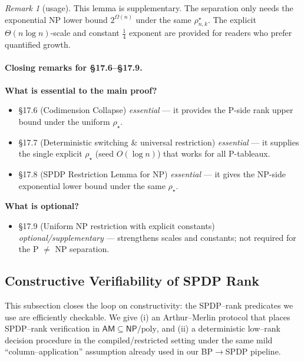 \documentclass[12pt]{article}
\theoremstyle{definition}
\theoremstyle{definition}
\theoremstyle{remark}
\newtheorem{remark}{Remark}
\theoremstyle{remark}
\begin{document}
\begin{remark}[usage]
This lemma is supplementary. The separation only needs the exponential NP lower bound $2^{\Omega(n)}$ under the same $\rho^\star_{n,k}$. The explicit $\Theta(n\log n)$-scale and constant $\frac{1}{4}$ exponent are provided for readers who prefer quantified growth.
\end{remark}

\paragraph{Closing remarks for \S17.6--\S17.9.}

\textbf{What is essential to the main proof?}

\begin{itemize}
\item \S17.6 (Codimension Collapse) \emph{essential} --- it provides the P-side rank upper bound under the uniform $\rho_\star$.
\item \S17.7 (Deterministic switching \& universal restriction) \emph{essential} --- it supplies the single explicit $\rho_\star$ (seed $O(\log n)$) that works for all P-tableaux.
\item \S17.8 (SPDP Restriction Lemma for NP) \emph{essential} --- it gives the NP-side exponential lower bound under the same $\rho_\star$.
\end{itemize}

\textbf{What is optional?}

\begin{itemize}
\item \S17.9 (Uniform NP restriction with explicit constants) \emph{optional/supplementary} --- strengthens scales and constants; not required for the P $\neq$ NP separation.
\end{itemize}

\subsection{Constructive Verifiability of SPDP Rank}

This subsection closes the loop on constructivity: the SPDP--rank predicates we use are efficiently checkable. We give (i) an Arthur--Merlin protocol that places SPDP--rank verification in $\mathsf{AM}\subseteq\mathsf{NP}/\mathrm{poly}$, and (ii) a deterministic low--rank decision procedure in the compiled/restricted setting under the same mild ``column--application'' assumption already used in our BP$\to$SPDP pipeline.
\end{document}

